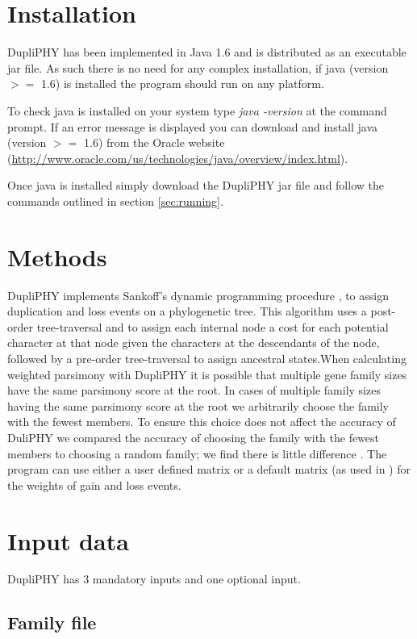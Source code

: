 \documentclass[10pt]{report}
\begin{document}
\section{Installation}

DupliPHY has been implemented in Java 1.6 and is distributed as an executable jar file. As such there is no need for any complex installation, if java (version $>=$ 1.6) is installed the program should run on any platform. 

To check java is installed on your system type {\it java -version} at the command prompt. If an error message is displayed you can download and install java (version $>=$ 1.6) from the Oracle website (\url{http://www.oracle.com/us/technologies/java/overview/index.html}). 

Once java is installed simply download the DupliPHY jar file and follow the commands outlined in section \ref{sec:running}.

\section{Methods}

DupliPHY implements Sankoff's dynamic programming procedure \cite{sankoff1975locating}, to assign duplication and loss events on a phylogenetic tree. This algorithm uses a post-order tree-traversal and to assign each internal node a cost for each potential character at that node given the characters at the descendants of the node, followed by a pre-order tree-traversal to assign ancestral states.When calculating weighted parsimony with DupliPHY it is possible that multiple gene family sizes have the same parsimony score at the root. In cases of multiple family sizes having the same parsimony score at the root we arbitrarily choose the family with the fewest members. To ensure this choice does not affect the accuracy of DuliPHY we compared the accuracy of choosing the family with the fewest members to choosing a random family; we find there is little difference \cite{ames2012determining}. The program can use either a user defined matrix or a default matrix (as used in \cite{ames2012determining}) for the weights of gain and loss events.

\section{Input data}

DupliPHY has 3 mandatory inputs and one optional input.

\subsection{Family file}
\label{sec:family}
\end{document}
